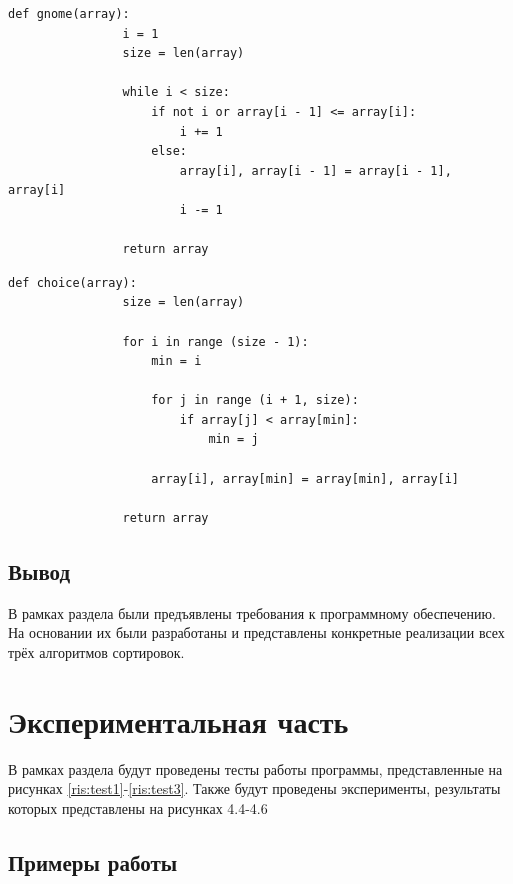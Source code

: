 \documentclass[a4paper,12pt]{report}
\begin{document}
	        \begin{lstlisting}[frame = single, breaklines, caption = Гномья сортировка, label=list:gnome]
	       	def gnome(array):
	       		i = 1
	       		size = len(array)
	        	
	       		while i < size:
	        		if not i or array[i - 1] <= array[i]:
	        			i += 1
	        		else:
	        			array[i], array[i - 1] = array[i - 1], array[i]
	        			i -= 1
	        	
	        	return array
	        \end{lstlisting}
	        
	        \begin{lstlisting}[frame = single, breaklines, caption = Сортировка выбором, label=list:choice]
	        def choice(array):
	        	size = len(array)
	        	
	        	for i in range (size - 1):
	        		min = i
	        	
	        		for j in range (i + 1, size):
	        			if array[j] < array[min]:
	        				min = j
	        	
	        		array[i], array[min] = array[min], array[i]
	        	
	        	return array
	        \end{lstlisting}
	        
	\section{Вывод}	
	
		В рамках раздела были предъявлены требования к программному обеспечению. 
		На основании их были разработаны и представлены конкретные реализации всех трёх алгоритмов сортировок.

    \newpage

    \chapter{Экспериментальная часть}
        \label{sec:experimental_part}

			В рамках раздела будут проведены тесты работы программы, представленные на рисунках \ref{ris:test1}-\ref{ris:test3}. 
			Также будут проведены эксперименты, результаты которых представлены на рисунках 4.4-4.6%

	\section{Примеры работы}
\end{document}
